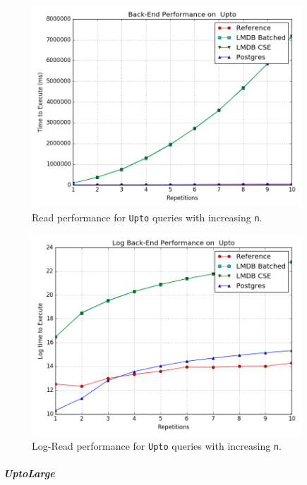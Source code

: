 \documentclass[12pt,a4paper,twoside,openright]{report}
\newcommand\codeName[1]{\texttt{#1}}
\begin{document}
 \begin{figure}[ht]
\centering
  \includegraphics[width=0.9\textwidth]{scripts/UptoTrend.png}
  \caption{Read performance for \codeName{Upto} queries with increasing \codeName{n}.}
  \label{fig:UptoTrend}
\end{figure}

 \begin{figure}[ht]
\centering
  \includegraphics[width=0.9\textwidth]{scripts/UptoLogTrend.png}
  \caption{Log-Read performance for \codeName{Upto} queries with increasing \codeName{n}.}
  \label{fig:UptoLogTrend}
\end{figure}
			\subparagraph{UptoLarge}
			
\end{document}
